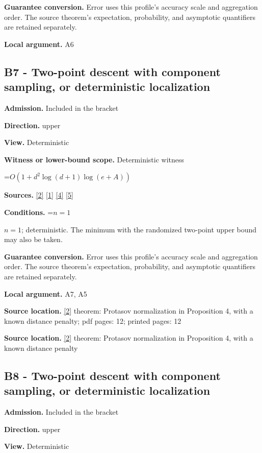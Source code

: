 \documentclass[10pt,a4paper]{article}
\newcommand{\AtlasMath}[1]{\par\begingroup\centering\setbox0=\hbox{$\displaystyle #1$}\ifdim\wd0>1.4\linewidth\typeout{ATLAS WIDE FORMULA: \the\wd0}\fi\ifdim\wd0>\linewidth\resizebox{\linewidth}{!}{\box0}\else\box0\fi\par\endgroup}
\newcommand{\AtlasInlineMath}[1]{\begingroup\setbox0=\hbox{$#1$}\ifdim\wd0>.4\linewidth\endgroup\AtlasMath{#1}\else\endgroup$#1$\fi}
\begin{document}
\textbf{Guarantee conversion.} Error uses this profile's accuracy scale and aggregation order. The source theorem's expectation, probability, and asymptotic quantifiers are retained separately.

\textbf{Local argument.} A6

\subsection{B7 - Two-point descent with component sampling, or deterministic localization}
\textbf{Admission.} Included in the bracket

\textbf{Direction.} upper

\textbf{View.} Deterministic

\textbf{Witness or lower-bound scope.} Deterministic witness

\AtlasMath{O(1+d^2\log(d+1)\log(e+A))}
\textbf{Sources.} \href{https://arxiv.org/html/2607.16558v2}{[2]} \href{https://arxiv.org/html/2610.00345v1}{[1]} \href{https://www.mathnet.ru/php/archive.phtml?jrnid=mzm&option_lang=eng&paperid=1697&wshow=paper}{[4]} \href{https://arxiv.org/abs/2109.08858}{[5]}

\textbf{Conditions.} \AtlasInlineMath{n=1}; deterministic. The minimum with the randomized two-point upper bound may also be taken.

\textbf{Guarantee conversion.} Error uses this profile's accuracy scale and aggregation order. The source theorem's expectation, probability, and asymptotic quantifiers are retained separately.

\textbf{Local argument.} A7, A5

\textbf{Source location.} \href{https://arxiv.org/html/2607.16558v2}{[2]} theorem: Protasov normalization in Proposition 4, with a known distance penalty; pdf pages: 12; printed pages: 12

\textbf{Source location.} \href{https://arxiv.org/html/2607.16558v2}{[2]} theorem: Protasov normalization in Proposition 4, with a known distance penalty

\subsection{B8 - Two-point descent with component sampling, or deterministic localization}
\textbf{Admission.} Included in the bracket

\textbf{Direction.} upper

\textbf{View.} Deterministic
\end{document}

